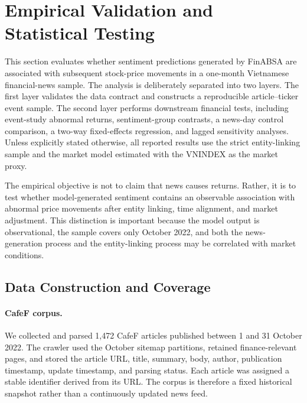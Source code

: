 %

\section{Empirical Validation and Statistical Testing}
\label{sec:validation}

This section evaluates whether sentiment predictions generated by FinABSA are associated with subsequent stock-price movements in a one-month Vietnamese financial-news sample. The analysis is deliberately separated into two layers. The first layer validates the data contract and constructs a reproducible article--ticker event sample. The second layer performs downstream financial tests, including event-study abnormal returns, sentiment-group contrasts, a news-day control comparison, a two-way fixed-effects regression, and lagged sensitivity analyses. Unless explicitly stated otherwise, all reported results use the strict entity-linking sample and the market model estimated with the VNINDEX as the market proxy.

The empirical objective is not to claim that news causes returns. Rather, it is to test whether model-generated sentiment contains an observable association with abnormal price movements after entity linking, time alignment, and market adjustment. This distinction is important because the model output is observational, the sample covers only October 2022, and both the news-generation process and the entity-linking process may be correlated with market conditions.

\subsection{Data Construction and Coverage}
\label{subsec:validation-data}

\paragraph{CafeF corpus.}
We collected and parsed 1,472 CafeF articles published between 1 and 31 October 2022. The crawler used the October sitemap partitions, retained finance-relevant pages, and stored the article URL, title, summary, body, author, publication timestamp, update timestamp, and parsing status. Each article was assigned a stable identifier derived from its URL. The corpus is therefore a fixed historical snapshot rather than a continuously updated news feed.

